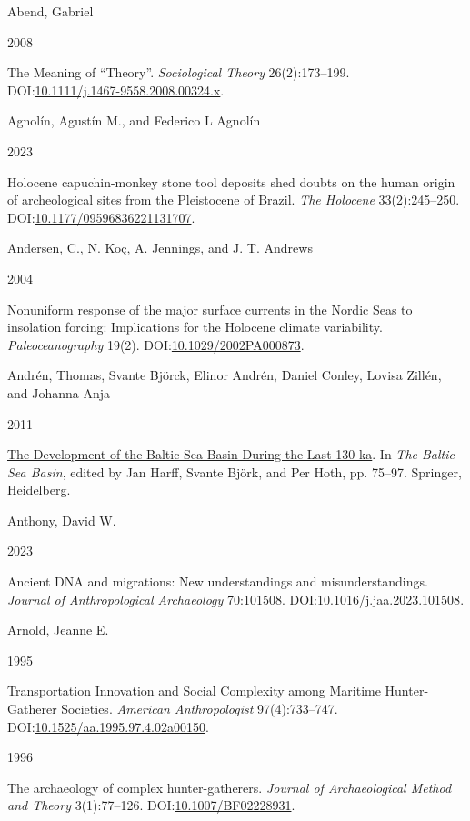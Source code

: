 \documentclass[
  12pt,
  a4paper,
  oneside]{book}
\newlength{\cslhangindent}
\newlength{\csllabelwidth}
\newlength{\cslentryspacingunit} %
\newenvironment{CSLReferences}[2] %
 {%
  \setlength{\parindent}{0pt}
  \ifodd #1
  \let\oldpar\par
  \def\par{\hangindent=\cslhangindent\oldpar}
  \fi
  \setlength{\parskip}{#2\cslentryspacingunit}
 }%
 {}
\newcommand{\CSLBlock}[1]{#1\hfill\break}
\newcommand{\CSLLeftMargin}[1]{\parbox[t]{\csllabelwidth}{#1}}
\newcommand{\CSLRightInline}[1]{\parbox[t]{\linewidth - \csllabelwidth}{#1}\break}
\begin{document}
\hypertarget{refs}{}
\begin{CSLReferences}{0}{0}
\leavevmode{}%
\CSLBlock{Abend, Gabriel}
\CSLLeftMargin{ 2008}
\CSLRightInline{{The Meaning of {``Theory''}}. \emph{Sociological Theory} 26(2):173--199. DOI:\href{https://doi.org/10.1111/j.1467-9558.2008.00324.x}{10.1111/j.1467-9558.2008.00324.x}.}

\leavevmode{}%
\CSLBlock{Agnolín, Agustín M., and Federico L Agnolín}
\CSLLeftMargin{ 2023}
\CSLRightInline{{Holocene capuchin-monkey stone tool deposits shed doubts on the human origin of archeological sites from the Pleistocene of Brazil}. \emph{The Holocene} 33(2):245--250. DOI:\href{https://doi.org/10.1177/09596836221131707}{10.1177/09596836221131707}.}

\leavevmode{}%
\CSLBlock{Andersen, C., N. Koç, A. Jennings, and J. T. Andrews}
\CSLLeftMargin{ 2004}
\CSLRightInline{{Nonuniform response of the major surface currents in the Nordic Seas to insolation forcing: Implications for the Holocene climate variability}. \emph{Paleoceanography} 19(2). DOI:\href{https://doi.org/10.1029/2002PA000873}{10.1029/2002PA000873}.}

\leavevmode{}%
\CSLBlock{Andrén, Thomas, Svante Björck, Elinor Andrén, Daniel Conley, Lovisa Zillén, and Johanna Anja}
\CSLLeftMargin{ 2011}
\CSLRightInline{\href{https://doi.org/10.1007/978-3-642-17220-5_4}{{The Development of the Baltic Sea Basin During the Last 130 ka}}. In \emph{{The Baltic Sea Basin}}, edited by Jan Harff, Svante Björk, and Per Hoth, pp. 75--97. Springer, Heidelberg.}

\leavevmode{}%
\CSLBlock{Anthony, David W.}
\CSLLeftMargin{ 2023}
\CSLRightInline{Ancient DNA and migrations: New understandings and misunderstandings. \emph{Journal of Anthropological Archaeology} 70:101508. DOI:\href{https://doi.org/10.1016/j.jaa.2023.101508}{10.1016/j.jaa.2023.101508}.}

\leavevmode{}%
\CSLBlock{Arnold, Jeanne E.}
\CSLLeftMargin{ 1995}
\CSLRightInline{{Transportation Innovation and Social Complexity among Maritime Hunter-Gatherer Societies}. \emph{American Anthropologist} 97(4):733--747. DOI:\href{https://doi.org/10.1525/aa.1995.97.4.02a00150}{10.1525/aa.1995.97.4.02a00150}.}

\leavevmode{}%
\CSLLeftMargin{ 1996 }
\CSLRightInline{{The archaeology of complex hunter-gatherers}. \emph{Journal of Archaeological Method and Theory} 3(1):77--126. DOI:\href{https://doi.org/10.1007/BF02228931}{10.1007/BF02228931}.}


\end{CSLReferences}
\end{document}
